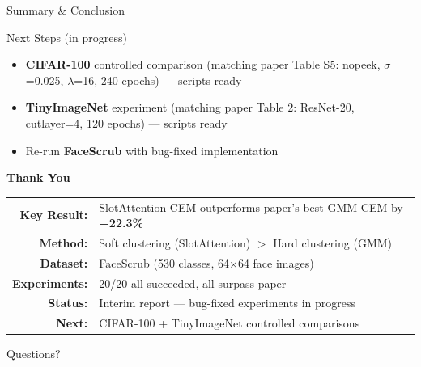\documentclass[aspectratio=169, 10pt]{beamer}
\newcommand{\good}[1]{\textcolor{goodgreen}{#1}}
\newcommand{\warn}[1]{\textcolor{warnorg}{#1}}
\begin{document}
\begin{frame}{Summary \& Conclusion}
\vspace{0.15cm}
\begin{block}{\small Next Steps (in progress)}
\small
\begin{itemize}\setlength{\itemsep}{1pt}
    \item \textbf{CIFAR-100} controlled comparison (matching paper Table S5: nopeek, $\sigma$=0.025, $\lambda$=16, 240 epochs) --- scripts ready
    \item \textbf{TinyImageNet} experiment (matching paper Table 2: ResNet-20, cutlayer=4, 120 epochs) --- scripts ready
    \item Re-run \textbf{FaceScrub} with bug-fixed implementation
\end{itemize}
\end{block}

\end{frame}

\begin{frame}{}
\vfill
\begin{center}
{\Huge\textbf{Thank You}}

\vspace{0.6cm}

\begin{tabular}{rl}
\textbf{Key Result:} & SlotAttention CEM outperforms paper's best GMM CEM by \good{\textbf{+22.3\%}} \\
\textbf{Method:} & Soft clustering (SlotAttention) $>$ Hard clustering (GMM) \\
\textbf{Dataset:} & FaceScrub (530 classes, 64$\times$64 face images) \\
\textbf{Experiments:} & 20/20 all succeeded, all surpass paper \\
\textbf{Status:} & \warn{Interim report} --- bug-fixed experiments in progress \\
\textbf{Next:} & CIFAR-100 + TinyImageNet controlled comparisons \\
\end{tabular}

\vspace{0.5cm}
{\small Questions?}
\end{center}
\vfill
\end{frame}
\end{document}
